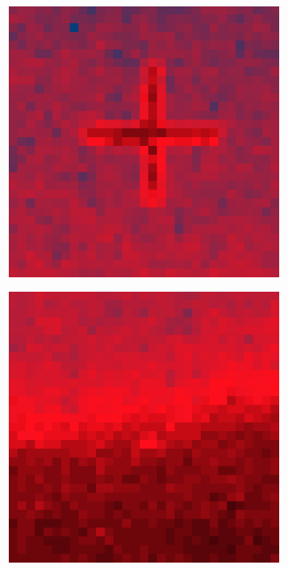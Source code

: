 \documentclass[10pt]{scrartcl}
\begin{document}
\begin{figure}[!ht]
    \begin{subfigure}[b]{.3\linewidth}
        \centering
        \includegraphics[width=1.2\linewidth]{../plots_tables_images/1d1dcrop_3_2.eps}
    \end{subfigure}
    \begin{subfigure}[b]{.3\linewidth}
        \centering
        \includegraphics[width=1.2\linewidth]{../plots_tables_images/1d1dcrop_4_0.eps}

\end{subfigure}
\end{figure}
\end{document}
